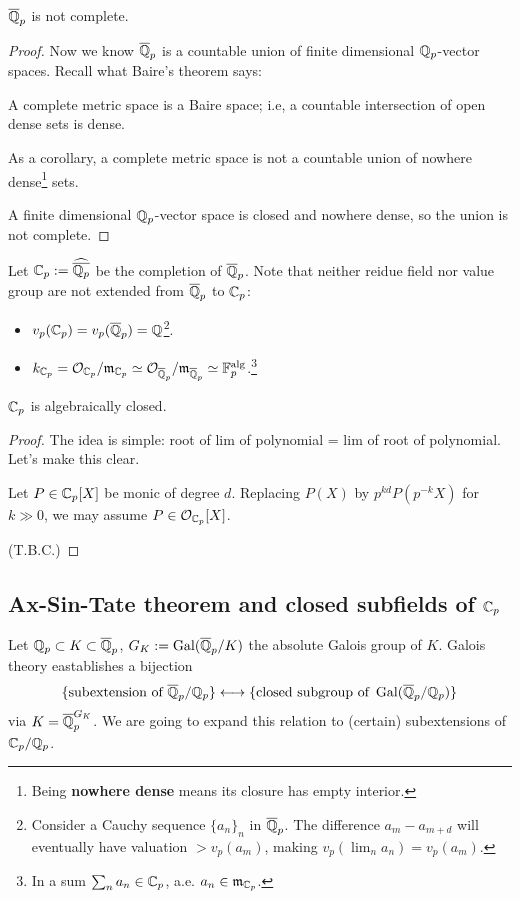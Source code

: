 \begin{corollary}
    $\overline{\mathbb{Q}}_p$ is not complete.
\end{corollary}
\begin{proof}
    Now we know $\overline{\mathbb{Q}}_p$ is a countable union of finite dimensional $\mathbb{Q}_p$-vector spaces.
    Recall what Baire's theorem says:
    \begin{theorem}
        \label{Baire thm}
        A complete metric space is a Baire space;
        i.e, a countable intersection of open dense sets is dense.

        As a corollary, a complete metric space is not a countable union of nowhere dense\footnote{Being \textbf{nowhere dense} means its closure has empty interior.} sets.
    \end{theorem}
    A finite dimensional $\mathbb{Q}_p$-vector space is closed and nowhere dense, so the union is not complete.
\end{proof}

Let $\mathbb{C}_p := \widehat{\overline{\mathbb{Q}_p}}$ be the completion of $\overline{\mathbb{Q}}_p$.
Note that neither reidue field nor value group are not extended from $\overline{\mathbb{Q}}_p$ to $\mathbb{C}_p$:
\begin{itemize}
    \item $v_p(\mathbb{C}_p) = v_p(\overline{\mathbb{Q}}_p) = \mathbb{Q}$\footnote{
        Consider a Cauchy sequence $\{a_n\}_n$ in $\overline{\mathbb{Q}}_p$.
        The difference $a_m-a_{m + d}$ will eventually have valuation $>v_p(a_m)$,
        making $v_p(\lim_{n}a_n) = v_p(a_m)$.
    }.
    \item $k_{\mathbb{C}_p} = \mathcal{O}_{\mathbb{C}_p}/\mathfrak{m}_{\mathbb{C}_p}\simeq\mathcal{O}_{\overline{\mathbb{Q}}_p}/\mathfrak{m}_{\overline{\mathbb{Q}}_p}\simeq\mathbb{F}_p^{\mathrm{alg}}$.\footnote{
        In a sum $\sum_n a_n\in\mathbb{C}_p$,
        a.e. $a_n\in\mathfrak{m}_{\mathbb{C}_p}$. 
    }
\end{itemize}

\begin{theorem}
    $\mathbb{C}_p$ is algebraically closed.
\end{theorem}
\begin{proof}
    The idea is simple: root of lim of polynomial = lim of root of polynomial. Let's make this clear.

    Let $P\in \mathbb{C}_p[X]$ be monic of degree $d$.
    Replacing $P(X)$ by $p^{kd}P(p^{-k} X)$ for $k\gg 0$, we may assume $P\in\mathcal{O}_{\mathbb{C}_p}[X]$.

    (T.B.C.)
\end{proof}

\subsection{Ax-Sin-Tate theorem and closed subfields of \texorpdfstring{$\mathbb{C}_p$}{Cp}}
Let $\mathbb{Q}_p\subset K\subset\overline{\mathbb{Q}}_p$, $G_K := \operatorname{Gal}(\overline{\mathbb{Q}}_p/K)$ the absolute Galois group of $K$.
Galois theory eastablishes a bijection \[
    \{\text{subextension of }\overline{\mathbb{Q}}_p/\mathbb{Q}_p\}\longleftrightarrow
    \{\text{closed subgroup of }\operatorname{Gal}(\overline{\mathbb{Q}}_p/\mathbb{Q}_p)\}
\] via $K = \overline{\mathbb{Q}}_p^{G_K}$.
We are going to expand this relation to (certain) subextensions of $\mathbb{C}_p/\mathbb{Q}_p$.

